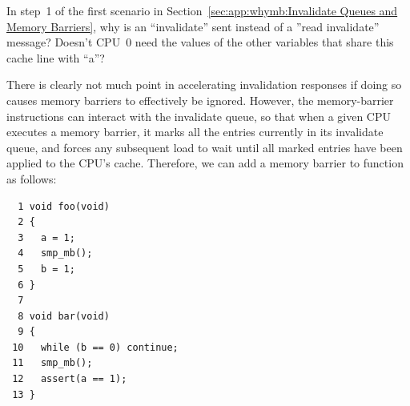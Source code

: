 \QuickQuiz{}
	In step~1 of the first scenario in
	Section~\ref{sec:app:whymb:Invalidate Queues and Memory Barriers},
	why is an ``invalidate'' sent instead of a ''read invalidate''
	message?
	Doesn't CPU~0 need the values of the other variables that share
	this cache line with ``a''?
 \QuickQuizEnd

There is clearly not much point in accelerating invalidation responses
if doing so causes memory barriers to effectively be ignored.
However, the memory-barrier instructions can interact with
the invalidate queue, so that when a given CPU executes a memory
barrier, it marks all the entries currently in its invalidate queue,
and forces any subsequent load to wait until all marked entries
have been applied to the CPU's cache.
Therefore, we can add a memory barrier to function  as follows:

\vspace{5pt}
\begin{minipage}[t]{\columnwidth}
\small
\begin{verbatim}
  1 void foo(void)
  2 {
  3   a = 1;
  4   smp_mb();
  5   b = 1;
  6 }
  7
  8 void bar(void)
  9 {
 10   while (b == 0) continue;
 11   smp_mb();
 12   assert(a == 1);
 13 }
\end{verbatim}
\end{minipage}
\vspace{5pt}

